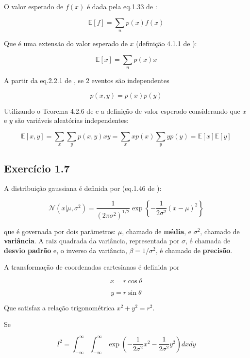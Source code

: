 \documentclass{article}
\begin{document}
   O valor esperado de $f(x)$ é dada pela eq.1.33 de \cite{Bishop2006}:  
   
   \[
     \mathbb{E}[f]= \sum_{n}p(x)f(x)
   \]
   
   Que é uma extensão do valor esperado de $x$ (definição 4.1.1 de \cite{DeGroot2012}):
   
   \[
   \mathbb{E}[x]= \sum_{n}p(x)x
   \]
   
   
   A partir da eq.2.2.1 de \cite{DeGroot2012} , se 2 eventos são independentes
   
   \[
   p(x,y) = p(x)p(y)
   \]
   
   Utilizando o Teorema 4.2.6 de \cite{DeGroot2012} e a definição de valor esperado considerando que $x$ e $y$ são variáveis aleatórias independentes: 
   
   \[
   \mathbb{E}[x,y]= \sum_{x} \sum_{y}p(x,y)xy = \sum_{x} xp(x) \sum_{y} y p(y) = \mathbb{E}[x]\mathbb{E}[y] 
   \]
   
\subsection{ Exerc\'icio 1.7}

    A distribuição gaussiana é definida por (eq.1.46 de \cite{Bishop2006}):
  
     \begin{equation}
        \mathcal{N}(x|\mu,\sigma^{2})=\frac{1}{(2\pi\sigma^{2})^{1/2}}\exp\left\{ -\frac{1}{2\sigma^{2}}(x-\mu)^{2}\right\}                              
     \end{equation}
  
  
  que é governada por dois parâmetros: $\mu$, chamado de \textbf{média}, e $\sigma^{2}$, chamado de \textbf{variância}.  A raiz quadrada da variância, representada por $\sigma$, é chamada de \textbf{desvio padrão} e,  o inverso da variância,  $\beta =1/\sigma^{2}$, é chamado de \textbf{precisão}.
  
  A transformação de coordenadas cartesianas é definida por
  
  \[
    x = r \cos \theta
  \]
  
  \[
  y = r \sin \theta
  \]
  
  Que satisfaz a relação trigonométrica $x^{2}+y^{2} = r^{2}$.
  
  
  Se
  
  \[
   I^{2}= \int_{-\infty}^{\infty} \int_{-\infty}^{\infty} \exp \left(-\frac{1}{2\sigma^{2}} x^{2} - \frac{1}{2\sigma^{2}} y^{2}  \right) dx dy
  \]
  
\end{document}
